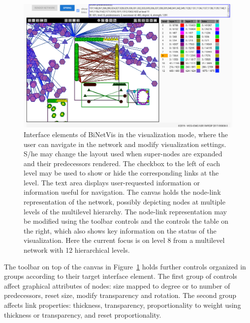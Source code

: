 \documentclass[runningheads]{llncs}
\begin{document}
\begin{figure}\centering
 \includegraphics[width=\textwidth]{secondPhase_}
  \caption{Interface elements of BiNetVis in the visualization mode, where the user can navigate in the network and modify visualization settings.
  S/he may change the layout used when super-nodes are expanded and their predecessors rendered.  The checkbox to the left of each level may be used to show or hide the corresponding links at the level.
  The text area displays user-requested information or information useful for navigation.
  The canvas holds the node-link representation of the network, possibly depicting nodes at multiple levels of the multilevel hierarchy. The node-link representation may be modified using the toolbar controls and the controls the table on the right, which also shows key information on the status of the visualization. Here the current focus is on level 8 from a multilevel network with 12 hierarchical levels. 
  }\label{secondPhase}
\end{figure}

The toolbar on top of the canvas in Figure~\ref{secondPhase} holds further controls organized in groups according to their target interface element.
The first group of controls affect graphical attributes of nodes: size mapped to degree or to number of predecessors, reset size, modify transparency and rotation.
The second group affects link properties: thickness, transparency, proportionality to weight
using thickness or transparency, and reset proportionality.
\end{document}
